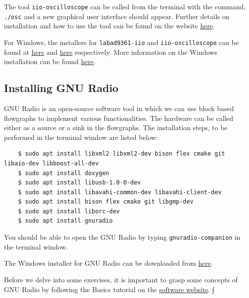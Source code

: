 \documentclass[11pt]{article}
\begin{document}
The tool \texttt{iio-oscilloscope} can be called from the terminal with the command, \texttt{./osc} and a new graphical user interface should appear. Further details on installation and how to use the tool can be found on the website \href{https://wiki.analog.com/resources/tools-software/linux-software/iio_oscilloscope}{here}.

\begin{tcolorbox}[colback=blue!5]
  For Windows, the installers for \texttt{labad9361-iio} and \texttt{iio-oscilloscope} can be found at \href{https://github.com/analogdevicesinc/libad9361-iio/releases}{here} and \href{https://github.com/analogdevicesinc/iio-oscilloscope/releases}{here} respectively. More information on the Windows installation can be found \href{https://wiki.analog.com/sdrseminars}{here}.
\end{tcolorbox}



\subsection{Installing GNU Radio}
GNU Radio is an open-source software tool in which we can use block based flowgraphs to implement various functionalities. The hardware can be called either as a source or a sink in the flowgraphs. The installation steps, to be performed in the terminal window are listed below:

\begin{mdframed}[backgroundcolor=gray!20]
  \tiny
  \begin{verbatim}
    $ sudo apt install libxml2 libxml2-dev bison flex cmake git libaio-dev libboost-all-dev
    $ sudo apt install doxygen
    $ sudo apt install libusb-1.0-0-dev
    $ sudo apt install libavahi-common-dev libavahi-client-dev
    $ sudo apt install bison flex cmake git libgmp-dev
    $ sudo apt install liborc-dev
    $ sudo apt install gnuradio
  \end{verbatim}
\end{mdframed}

You should be able to open the GNU Radio by typing \texttt{gnuradio-companion} in the terminal window. 

\begin{tcolorbox}[colback=blue!5]
  The Windows installer for GNU Radio can be downloaded from \href{http://www.gcndevelopment.com/gnuradio/index.htm}{here}. 
\end{tcolorbox}

Before we delve into some exercises, it is important to grasp some concepts of GNU Radio by following the Basics tutorial on the \href{https://wiki.gnuradio.org/index.php/TutorialsCoreConcepts}{software website}. ∫
\end{document}
